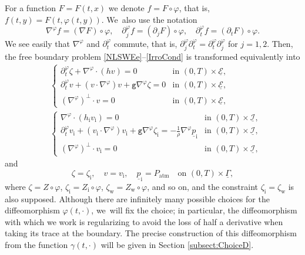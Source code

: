 \documentclass[11pt]{article}
\newcommand{\gr}{{\mathtt g}}
\newcommand{\dt}{\partial_t}
\newcommand{\cI}{{\mathcal I}}
\newcommand{\cE}{{\mathcal E}}
\newcommand{\ul}[1]{\underline{#1}}
\newcommand{\itGamma}{\mathit{\Gamma}}
\theoremstyle{definition}
\begin{document}
For a function $F=F(t,x)$ we denote $f=F\circ\varphi$, that is, $f(t,y)=F(t,\varphi(t,y))$. We~also use the notation
\begin{equation}\label{DiffOP}
\nabla^\varphi f=(\nabla F)\circ\varphi, \quad \partial_j^\varphi f=(\partial_j F)\circ\varphi,
\quad \dt^\varphi f=(\dt F)\circ\varphi.
\end{equation}
We see easily that $\nabla^\varphi$ and $\dt^\varphi$ commute, that is, $\partial_j^\varphi \dt^\varphi = \dt^\varphi \partial_j^\varphi$ for $j=1,2$.
Then, the free boundary problem \eqref{NLSWEe}--\eqref{IrroCond} is transformed equivalently into
\begin{align}\label{nlswe}
&\begin{cases}
\dt^\varphi\zeta+\nabla^\varphi\cdot(hv) = 0 &\text{in } (0,T)\times\ul{\cE}, \\
\dt^\varphi v+(v\cdot\nabla^\varphi)v+\gr\nabla^\varphi \zeta = 0 &\text{in } (0,T)\times\ul{\cE}, \\
(\nabla^\varphi)^\perp\cdot v=0 &\text{in } (0,T)\times\ul{\cE},
\end{cases}
\\
\label{nlswi}
&\begin{cases}
\nabla^\varphi\cdot(h_\mathrm{i}v_\mathrm{i}) = 0 &\text{in } (0,T)\times\ul{\cI}, \\
\dt^\varphi v_\mathrm{i}+(v_\mathrm{i}\cdot\nabla^\varphi)v_\mathrm{i}+\gr\nabla^\varphi \zeta_\mathrm{i}
= -\frac{1}{\rho}\nabla^\varphi\ul{p}_\mathrm{i} &\text{in } (0,T)\times\ul{\cI}, \\
(\nabla^\varphi)^\perp\cdot v_\mathrm{i}=0 &\text{in } (0,T)\times\ul{\cI},
\end{cases}
\end{align}
and
\begin{equation}\label{mc}
\zeta=\zeta_\mathrm{i}, \quad v=v_\mathrm{i}, \quad \ul{p}_\mathrm{i}=P_\mathrm{atm} \quad\text{on } (0,T)\times\ul{\itGamma},
\end{equation}
where $\zeta=Z\circ\varphi$, $\zeta_\mathrm{i}=Z_\mathrm{i}\circ\varphi$, $\zeta_\mathrm{w}=Z_\mathrm{w}\circ\varphi$, and so on,
and the constraint $\zeta_\mathrm{i}=\zeta_\mathrm{w}$ is also supposed.
Although there are infinitely many possible choices for the diffeomorphism $\varphi(t,\cdot)$, we~will fix the choice;
in particular, the diffeomorphism with which we work is regularizing to avoid the loss of half a derivative when taking its trace at the boundary.
The precise construction of this diffeomorphism from the function $\gamma(t,\cdot)$ will be given in Section \ref{subsect:ChoiceD}.
\end{document}
